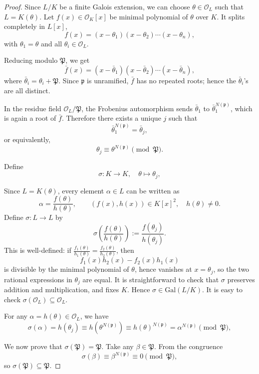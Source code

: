 \begin{proof}
Since \(L/K\) be a finite Galois extension, we can choose \(\theta \in \mathcal{O}_L\) such that \(L = K(\theta)\). Let \(f(x) \in \mathcal{O}_K[x]\) be minimal polynomial of $\theta$ over \(K\). It splits completely in \(L[x]\),
\[
f(x) = (x - \theta_1)(x - \theta_2)\cdots(x - \theta_n),
\]
with \(\theta_1 = \theta\) and all \(\theta_i \in \mathcal{O}_L\).

Reducing modulo \(\mathfrak{P}\), we get
\[
\bar{f}(x) = (x - \bar{\theta}_1)(x - \bar{\theta}_2)\cdots(x - \bar{\theta}_n),
\]
where \(\bar{\theta}_i = \theta_i + \mathfrak{P}\). Since \(\mathfrak{p}\) is unramified, \(\bar{f}\) has no repeated roots; hence the \(\bar{\theta}_i\)'s are all distinct.

In the residue field $\mathcal O_L/\mathfrak{P}$, the Frobenius automorphism sends \(\bar{\theta}_1\) to \(\bar{\theta}_1^{N(\mathfrak{p})}\), which is again a root of \(\bar{f}\). Therefore there exists a unique \(j\) such that
\[
\bar{\theta}_1^{N(\mathfrak{p})} = \bar{\theta}_j,
\]
or equivalently,
\[
\theta_j \equiv \theta^{N(\mathfrak{p})} \pmod{\mathfrak{P}}.
\]

Define
\[
\sigma:K\to K,\quad \theta\mapsto\theta_j,
\]

Since \(L = K(\theta)\), every element \(\alpha \in L\) can be written as
\[
\alpha = \frac{f(\theta)}{h(\theta)}, \qquad (f(x), h(x)) \in K[x]^2, \quad h(\theta) \neq 0.
\]
Define \(\sigma: L \to L\) by
\[
\sigma\!\left(\frac{f(\theta)}{h(\theta)}\right) := \frac{f(\theta_j)}{h(\theta_j)}.
\]
This is well-defined: if \(\frac{f_1(\theta)}{h_1(\theta)} = \frac{f_2(\theta)}{h_2(\theta)}\), then
\[
f_1(x)h_2(x) - f_2(x)h_1(x)
\]
is divisible by the minimal polynomial of \(\theta\), hence vanishes at \(x = \theta_j\), so the two rational expressions in \(\theta_j\) are equal. It is straightforward to check that \(\sigma\) preserves addition and multiplication, and fixes \(K\). Hence \(\sigma \in \mathrm{Gal}(L/K)\). It is easy to check $\sigma(\mathcal{O}_L)\subseteq \mathcal{O}_L$.

For any \(\alpha = h(\theta) \in \mathcal{O}_L\), we have
\[
\sigma(\alpha) = h(\theta_j) \equiv h(\theta^{N(\mathfrak{p})}) \equiv h(\theta)^{N(\mathfrak{p})} = \alpha^{N(\mathfrak{p})} \pmod{\mathfrak{P}},
\]

We now prove that \(\sigma(\mathfrak{P}) = \mathfrak{P}\).  
Take any \(\beta \in \mathfrak{P}\). From the congruence
\[
\sigma(\beta) \equiv \beta^{N(\mathfrak{p})} \equiv0\pmod{\mathfrak{P}},
\]
so \(\sigma(\mathfrak{P}) \subseteq \mathfrak{P}\).


\end{proof}
